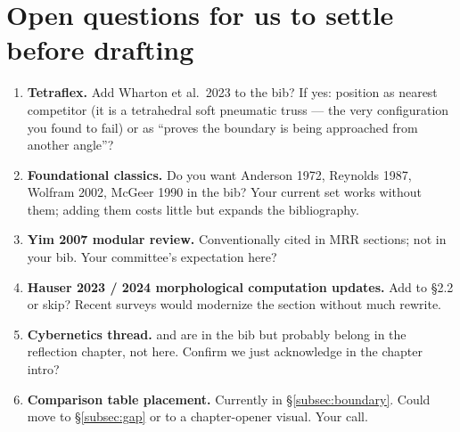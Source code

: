 \section*{Open questions for us to settle before drafting}
\label{sec:open-questions}

\begin{enumerate}
    \item \textbf{Tetraflex.} Add Wharton et al.\ 2023 to the bib?
          If yes: position as nearest competitor (it is a tetrahedral
          soft pneumatic truss --- the very configuration you found
          to fail) or as ``proves the boundary is being approached
          from another angle''?
    \item \textbf{Foundational classics.} Do you want Anderson 1972,
          Reynolds 1987, Wolfram 2002, McGeer 1990 in the bib? Your
          current set works without them; adding them costs little
          but expands the bibliography.
    \item \textbf{Yim 2007 modular review.} Conventionally cited in
          MRR sections; not in your bib. Your committee's expectation
          here?
    \item \textbf{Hauser 2023 / 2024 morphological computation
          updates.} Add to \S2.2 or skip? Recent surveys would
          modernize the section without much rewrite.
    \item \textbf{Cybernetics thread.} \cite{glanvilleSECONDORDERCYBERNETICS}
          and \cite{sheridanHumanRobotInteractionStatus2016} are in the
          bib but probably belong in the reflection chapter, not here.
          Confirm we just acknowledge in the chapter intro?
    \item \textbf{Comparison table placement.} Currently in
          \S\ref{subsec:boundary}. Could move to \S\ref{subsec:gap}
          or to a chapter-opener visual. Your call.
\end{enumerate}
